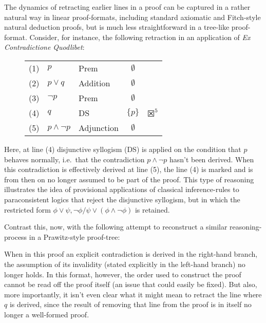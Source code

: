 \documentclass[]{article}
\begin{document}
The dynamics of retracting earlier lines in a proof can be captured in a rather natural way in linear proof-formats, including standard axiomatic and Fitch-style natural deduction proofs, but is much less straightforward in a tree-like proof-format. Consider, for instance, the following retraction in an application of \emph{Ex Contradictione Quodlibet}:

\begin{figure}[h!]
\centering
    \begin{tabular}{cllcl}
        (1) & $p$ & Prem & $\emptyset$\\
        (2) & $p \vee q$ & Addition & $\emptyset$\\
        (3) & $\neg p$ & Prem & $\emptyset$\\
        (4) & $q$ & DS & $\{p\}$ & $\XBox^5$\\
        (5) & $p \wedge \neg p$ & Adjunction & $\emptyset$
    \end{tabular}
\end{figure}
\noindent Here, at line (4) disjunctive syllogism (DS) is applied on the condition that $p$ behaves normally, i.e.\ that the contradiction $p \wedge \neg p$ hasn't been derived. When this contradiction is effectively derived at line (5), the line (4) is marked and is from then on no longer assumed to be part of the proof. This type of reasoning illustrates the idea of provisional applications of classical inference-rules to paraconsistent logics that reject the disjunctive syllogism, but in which the restricted form $\phi \vee \psi, \neg \phi / \psi \vee (\phi \wedge \neg \phi)$ is retained.

Contrast this, now, with the following attempt to reconstruct a similar reasoning-process in a Prawitz-style proof-tree:
\begin{prooftree}
\end{prooftree}
When in this proof an explicit contradiction is derived in the right-hand branch, the assumption of its invalidity (stated explicitly in the left-hand branch) no longer holds. In this format, however, the order used to construct the proof cannot be read off the proof itself (an issue that could easily be fixed). But also, more importantly, it isn't even clear what it might mean to retract the line where $q$ is derived, since the result of removing that line from the proof is in itself no longer a well-formed proof.
\end{document}
